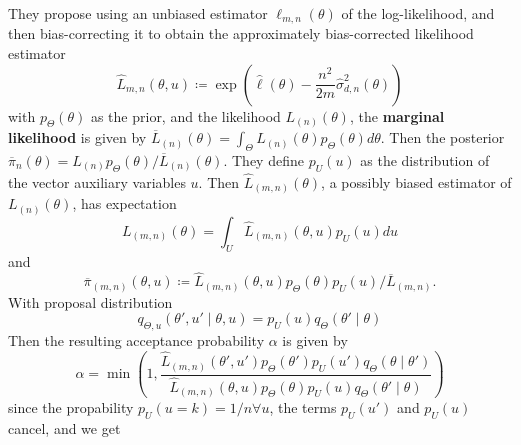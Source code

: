 {
They propose using an unbiased estimator $\ell_{m,n}\left(\theta\right)$ of the log-likelihood, and then bias-correcting it to obtain the approximately bias-corrected likelihood estimator
\begin{equation}
   \hat{L}_{m,n}\left(\theta, u\right) \coloneqq \exp\left(\hat{\ell}\left(\theta\right) - \frac{n^2}{2m}\hat{\sigma}_{d,n}^2\left(\theta\right)\right)
\end{equation}
with $p_{\Theta}\left(\theta\right)$ as the prior, and the likelihood $L_{\left(n\right)}\left(\theta\right)$, the \textbf{marginal likelihood} is given by $\overline{L}_{\left(n\right)}\left(\theta\right) = \int_{\Theta} L_{\left(n\right)}\left(\theta\right)p_{\Theta}\left(\theta\right) d\theta$. 
Then the posterior $\overline{\pi}_n\left(\theta\right) = L_{\left(n\right)}p_{\Theta}\left(\theta\right)/\overline{L}_{\left(n\right)}\left(\theta\right)$. 
They define $p_U\left(u\right)$ as the distribution of the vector auxiliary variables $u$. 
Then $\hat{L}_{\left(m,n\right)}\left(\theta\right)$, a possibly biased estimator of $L_{\left(n\right)}\left(\theta\right)$, has expectation 
\begin{equation}
    L_{\left(m,n\right)}\left(\theta\right) = \int_U \hat{L}_{\left(m,n\right)}\left(\theta, u\right) p_U\left(u\right) du 
\end{equation}
and 
\begin{equation}
    \overline{\pi}_{\left(m,n\right)} \left(\theta, u\right) \coloneqq \hat{L}_{\left(m,n\right)}\left(\theta, u\right)p_{\Theta}\left(\theta\right)p_U\left(u\right)/\overline{L}_{\left(m,n\right)}.
\end{equation}
With proposal distribution
\begin{equation}
    q_{\Theta, u}\left(\theta', u'\mid \theta, u\right) = p_U\left(u\right)q_{\Theta}\left(\theta'\mid \theta\right)
\end{equation}
Then the resulting acceptance probability $\alpha$ is given by 
\begin{equation}
    \alpha = \min\left(1, \frac{\hat{L}_{\left(m,n\right)}\left(\theta', u'\right)p_{\Theta}\left(\theta'\right)p_U\left(u'\right)q_{\Theta}\left(\theta\mid \theta'\right)}{\hat{L}_{\left(m,n\right)}\left(\theta, u\right)p_{\Theta}\left(\theta\right)p_U\left(u\right)q_{\Theta}\left(\theta'\mid \theta\right)}\right)
\end{equation}
since the propability $p_U\left(u = k\right) = 1/n \forall u$, the terms $p_U\left(u'\right)$ and $p_U\left(u\right)$ cancel, and we get 
}
